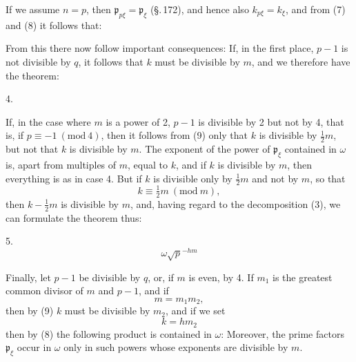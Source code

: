 
If we assume $n = p$, then $\mathfrak{p}_{p\xi} = \mathfrak{p}_\xi$ (\S.\,172), and hence also $k_{p\xi} = k_\xi$, and from (7) and (8) it follows that:

From this there now follow important consequences: If, in the first place, $p - 1$ is not divisible by $q$, it follows that $k$ must be divisible by $m$, and we therefore have the theorem:

4. 

If, in the case where $m$ is a power of 2, $p - 1$ is divisible by 2 but not by 4, that is, if $p \equiv -1 \ (\mathrm{mod}\ 4)$, then it follows from (9) only that $k$ is divisible by $\tfrac{1}{2} m$, but not that $k$ is divisible by $m$. The exponent of the power of $\mathfrak{p}_\xi$ contained in $\omega$ is, apart from multiples of $m$, equal to $k$, and if $k$ is divisible by $m$, then everything is as in case 4. But if $k$ is divisible only by $\tfrac{1}{2} m$ and not by $m$, so that
\[
k \equiv \tfrac{1}{2} m \ (\mathrm{mod}\ m),
\]
then $k - \tfrac{1}{2} m$ is divisible by $m$, and, having regard to the decomposition (3), we can formulate the theorem thus:

5. 
\[
\omega \sqrt{p}^{-hm}
\]

Finally, let $p - 1$ be divisible by $q$, or, if $m$ is even, by 4. If $m_1$ is the greatest common divisor of $m$ and $p - 1$, and if
\[
m = m_1 m_2,
\]
then by (9) $k$ must be divisible by $m_2$, and if we set
\[
k = h m_2
\]
then by (8) the following product is contained in $\omega$:
Moreover, the prime factors $\mathfrak{p}_\xi$ occur in $\omega$ only in such powers whose exponents are divisible by $m$.
